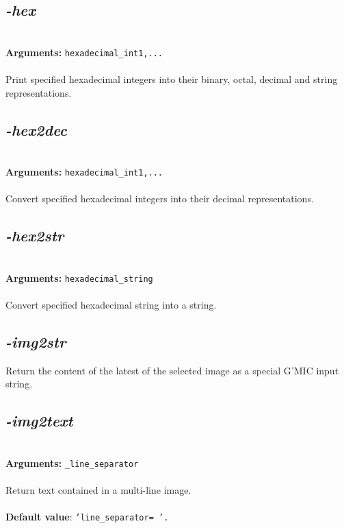 \documentclass[a4paper,11pt,twoside]{book}
\begin{document}
\subsection{\emph{-hex} }\vspace*{-0.5em}
~\\\textbf{Arguments: } 
{\small \texttt{hexadecimal\_int1,...}}\\~\\
Print specified hexadecimal integers into their binary, octal, decimal and string representations.


\subsection{\emph{-hex2dec} }\vspace*{-0.5em}
~\\\textbf{Arguments: } 
{\small \texttt{hexadecimal\_int1,...}}\\~\\
Convert specified hexadecimal integers into their decimal representations.


\subsection{\emph{-hex2str} }\vspace*{-0.5em}
~\\\textbf{Arguments: } 
{\small \texttt{hexadecimal\_string}}\\~\\
Convert specified hexadecimal string into a string.


\subsection{\emph{-img2str} }\vspace*{-0.5em}
Return the content of the latest of the selected image as a special G'MIC input string.


\subsection{\emph{-img2text} }\vspace*{-0.5em}
~\\\textbf{Arguments: } 
{\small \texttt{\_line\_separator}}\\~\\
Return text contained in a multi-line image.
~\\~\\\textbf{Default value}: {\small \texttt{'line\_separator= '.}}
\end{document}

